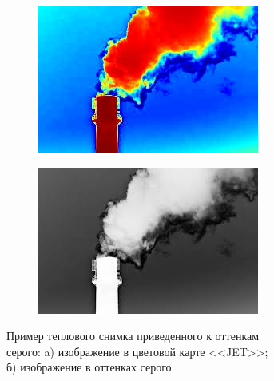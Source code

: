 \documentclass[14pt, a4paper]{extreport}
\begin{document}
	\begin{figure}[h!]
		\begin{subfigure}{.45\textwidth}
			\centering
			\includegraphics[width = \textwidth]{image/chapter_2/abstrtact_JET_example}
			\caption{}
		\end{subfigure}
		\begin{subfigure}{.45\textwidth}
			\centering
			\includegraphics[width = \textwidth]{image/chapter_2/abstrtact_gray_example}
			\caption{}
		\end{subfigure}
		\centering
		\caption{Пример теплового снимка приведенного к оттенкам \\серого: a) изображение в цветовой карте <<JET>>;\\ б) изображение в оттенках серого}
		\label{fig:gray_tep_example}
	\end{figure}
	
\end{document}
